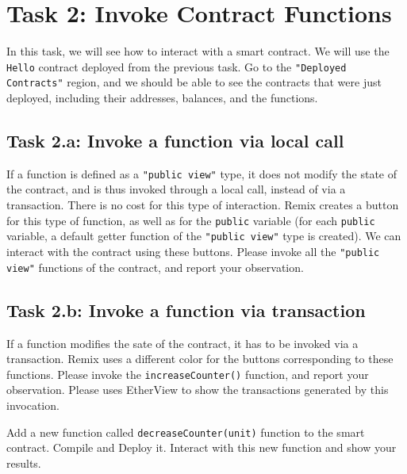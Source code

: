 \section{Task 2: Invoke Contract Functions} 

In this task, we will see how to interact with a smart contract.
We will use the \texttt{Hello} contract deployed from the previous 
task. Go to the \texttt{"Deployed Contracts"} region,  
and we should be able to see the contracts that were
just deployed, including their addresses, balances,
and the functions. 


\subsection{Task 2.a: Invoke a function via local call} 

If a function is defined as a \texttt{"public view"} type, 
it does not modify the state of the contract, and is thus 
invoked through a local call, instead of via a transaction. 
There is no cost for this type of interaction. Remix creates a button 
for this type of function, as well as for the \texttt{public} 
variable (for each \texttt{public} variable, a default getter function of 
the \texttt{"public view"} type is created). 
We can interact with the contract using these buttons. 
Please invoke all the \texttt{"public view"} functions of the contract,
and report your observation. 


\subsection{Task 2.b: Invoke a function via transaction} 

If a function modifies the sate of the contract, it has to 
be invoked via a transaction. Remix uses a different 
color for the buttons corresponding to these functions. 
Please invoke the \texttt{increaseCounter()} function,
and report your observation. Please uses EtherView
to show the transactions generated by this invocation. 

Add a new function called \texttt{decreaseCounter(unit)} 
function to the smart contract. Compile and Deploy it.
Interact with this new function and show your results. 





